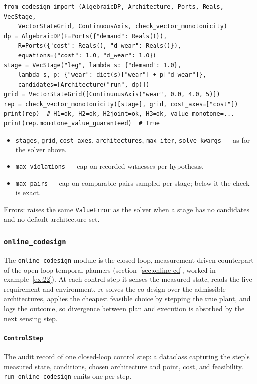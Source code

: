 \documentclass[11pt,a4paper]{article}
\begin{document}
\begin{lstlisting}
from codesign import (AlgebraicDP, Architecture, Ports, Reals, VecStage,
    VectorStateGrid, ContinuousAxis, check_vector_monotonicity)
dp = AlgebraicDP(F=Ports({"demand": Reals()}),
    R=Ports({"cost": Reals(), "d_wear": Reals()}),
    equations={"cost": 1.0, "d_wear": 1.0})
stage = VecStage("leg", lambda s: {"demand": 1.0},
    lambda s, p: {"wear": dict(s)["wear"] + p["d_wear"]},
    candidates=[Architecture("run", dp)])
grid = VectorStateGrid([ContinuousAxis("wear", 0.0, 4.0, 5)])
rep = check_vector_monotonicity([stage], grid, cost_axes=["cost"])
print(rep)  # H1=ok, H2=ok, H2joint=ok, H3=ok, value_monotone=...
print(rep.monotone_value_guaranteed)  # True
\end{lstlisting}

\begin{itemize}[nosep]
  \item \texttt{stages}, \texttt{grid}, \texttt{cost\_axes},
    \texttt{architectures}, \texttt{max\_iter}, \texttt{solve\_kwargs} ---
    as for the solver above.
  \item \texttt{max\_violations} --- cap on recorded witnesses per hypothesis.
  \item \texttt{max\_pairs} --- cap on comparable pairs sampled per stage;
    below it the check is exact.
\end{itemize}
Errors: raises the same \texttt{ValueError} as the solver when a stage has no
candidates and no default architecture set.

\subsubsection{\texttt{online\_codesign}}
\label{ref:online_codesign}

The \texttt{online\_codesign} module is the closed-loop, measurement-driven
counterpart of the open-loop temporal planners (section~\ref{sec:online-cd},
worked in example~\ref{ex:22}). At each control step it senses the measured
state, reads the live requirement and environment, re-solves the co-design
over the admissible architectures, applies the cheapest feasible choice by
stepping the true plant, and logs the outcome, so divergence between plan and
execution is absorbed by the next sensing step.

\paragraph{\texttt{ControlStep}}\label{ref:online_codesign:controlstep}
The audit record of one closed-loop control step: a dataclass capturing the
step's measured state, conditions, chosen architecture and point, cost, and
feasibility. \texttt{run\_online\_codesign} emits one per step.
\end{document}
